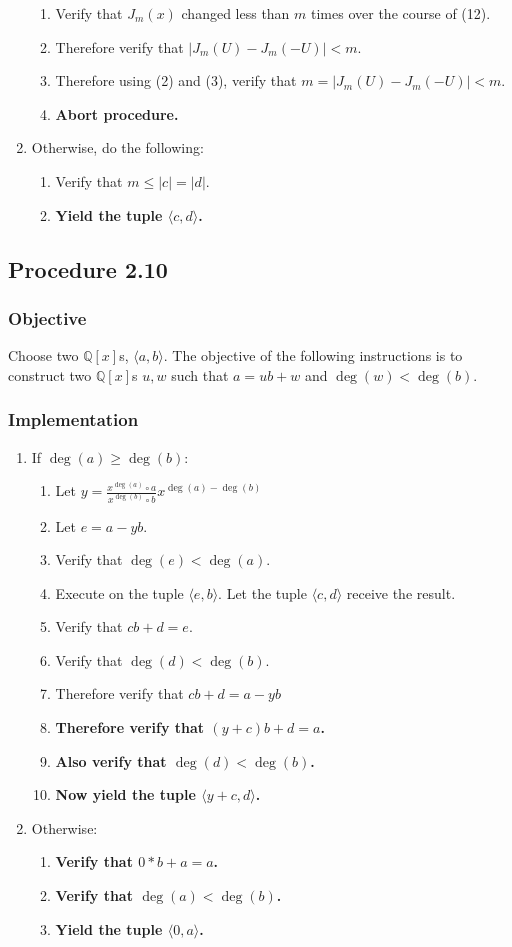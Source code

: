 \documentclass[twocolumn]{article}
\newcommand{\procedure}[2][]{\subsection*{Procedure #2 \ifthenelse{\equal{#1}{}}{}{(#1)}}\label{sec:procedure #2}}
\newcommand{\objective}{\subsubsection*{Objective}}
\newcommand{\implementation}{\subsubsection*{Implementation}}
\newcommand{\procedurehr}[2][]{\hyperref[sec:procedure #2]{\ifthenelse{\equal{#1}{}}{procedure #2}{#1}}}
\begin{document}
\begin{enumerate}
\begin{enumerate}
						\item Verify that $J_m(x)$ changed less than $m$ times over the course of (12).
						\item Therefore verify that $\lvert J_m(U)-J_m(-U)\rvert<m$.
						\item Therefore using (2) and (3), verify that $m=\lvert J_m(U)-J_m(-U)\rvert<m$.
						\item \textbf{Abort procedure.}
					\end{enumerate}
					\item Otherwise, do the following:
					\begin{enumerate}
						\item Verify that $m\le\lvert c\rvert=\lvert d\rvert$.
						\item \textbf{Yield the tuple $\langle c,d\rangle$.}
					\end{enumerate}
				\end{enumerate}
		\procedure{2.10}
			\objective
				Choose two $\mathbb{Q}[x]$s, $\langle a,b\rangle$. The objective of the following instructions is to construct two $\mathbb{Q}[x]$s $u,w$ such that $a=ub+w$ and $\deg(w)<\deg(b)$.
			\implementation
				\begin{enumerate}
					\item If $\deg(a)\ge\deg(b)$:
					\begin{enumerate}
						\item Let $y=\frac{x^{\deg(a)}\circ a}{x^{\deg(b)}\circ b}x^{\deg(a)-\deg(b)}$
						\item Let $e=a-yb$.
						\item Verify that $\deg(e)<\deg(a)$.
						\item Execute \procedurehr{2.10} on the tuple $\langle e,b\rangle$. Let the tuple $\langle c,d\rangle$ receive the result.
						\item Verify that $cb+d=e$.
						\item Verify that $\deg(d)<\deg(b)$.
						\item Therefore verify that $cb+d=a-yb$
						\item \textbf{Therefore verify that $(y+c)b+d=a$.}
						\item \textbf{Also verify that $\deg(d)<\deg(b)$.}
						\item \textbf{Now yield the tuple $\langle y+c, d\rangle$.}
					\end{enumerate}
					\item Otherwise:
					\begin{enumerate}
						\item \textbf{Verify that $0*b+a=a$.}
						\item \textbf{Verify that $\deg(a)<\deg(b)$.}
						\item \textbf{Yield the tuple $\langle 0,a\rangle$.}
					\end{enumerate}
				\end{enumerate}
\end{document}
